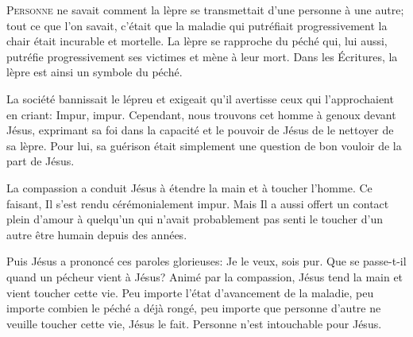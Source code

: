 




\lettrine{P}{ersonne} ne savait comment la lèpre se transmettait
 d'une personne à une autre; tout ce que l'on savait, c'était que la maladie
 \ocadr qui putréfiait progressivement la chair \fcadr{}
 était incurable et mortelle. La lèpre se rapproche du péché qui,
 lui aussi, putréfie progressivement ses victimes et mène à leur mort.
 Dans les Écritures, la lèpre est ainsi un symbole du péché. 

La société bannissait le lépreu et exigeait qu'il avertisse
 ceux qui l'approchaient en criant: 
 \Og Impur, impur. \Fg{}
 Cependant, nous trouvons cet homme à genoux devant Jésus,
 exprimant sa foi dans la capacité et le pouvoir de Jésus
 de le nettoyer de sa lèpre. Pour lui, sa guérison était simplement
 une question de bon vouloir de la part de Jésus. 


La compassion a conduit Jésus à étendre la main et à toucher l'homme.
 Ce faisant, Il s'est rendu cérémonialement impur.
 Mais Il a aussi offert un contact plein d'amour à quelqu'un
 qui n'avait probablement pas senti le toucher d'un autre être humain
 depuis des années. 

Puis Jésus a prononcé ces paroles glorieuses: 
 \Og Je le veux, sois pur. \Fg{}
 Que se passe-t-il quand un pécheur vient à Jésus?
 Animé par la compassion, Jésus tend la main et vient toucher cette vie.
 Peu importe l'état d'avancement de la maladie,
 peu importe combien le péché a déjà rongé, peu importe que personne
 d'autre ne veuille toucher cette vie, Jésus le fait.
 Personne n'est intouchable pour Jésus. 

\dvrule

